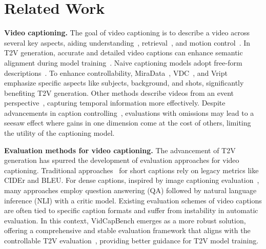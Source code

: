 \section{Related Work}
\noindent\textbf{Video captioning.}
The goal of video captioning is to describe a video across several key aspects, aiding understanding~\cite{doveh2023dense}, retrieval~\cite{ma2024drvideo}, and motion control~\cite{wang2024motionctrl}.
In T2V generation, accurate and detailed video captions can enhance semantic alignment during model training~\cite{polyak2024movie}.
Naive captioning models adopt free-form descriptions~\cite{chen2024panda,wang2024koala}.
To enhance controllability, MiraData~\cite{ju2024miradata}, VDC~\cite{chai2024auroracap}, and Vript~\cite{yang2024vript} emphasize specific aspects like subjects, background, and shots, significantly benefiting T2V generation.
Other methods describe videos from an event perspective~\cite{wang2024tarsier,he2024storyteller}, capturing temporal information more effectively.
Despite advancements in caption controlling~\cite{wang2023caption,hua2024finecaption}, 
evaluations with omissions may lead to a seesaw effect where gains in one dimension come at the cost of others, limiting the utility of the captioning model.

\noindent\textbf{Evaluation methods for video captioning.}
The advancement of T2V generation has spurred the development of evaluation approaches for video captioning.
Traditional approaches~\cite{xu2017video,xu2016msr} for short captions rely on legacy metrics like CIDEr and BLEU.
For dense captions, inspired by image captioning evaluation~\cite{liu2024playground,prabhu2024trust,tu2024automatic}, many approaches employ question answering (QA) followed by natural language inference (NLI) with a critic model.
Existing evaluation schemes of video captions are often tied to specific caption formats and suffer from instability in automatic evaluation.
In this context, VidCapBench emerges as a more robust solution, offering a comprehensive and stable evaluation framework that aligns with the controllable T2V evaluation~\cite{rawte2024vibe,huang2024vbench++,he2024videoscore}, providing better guidance for T2V model training.